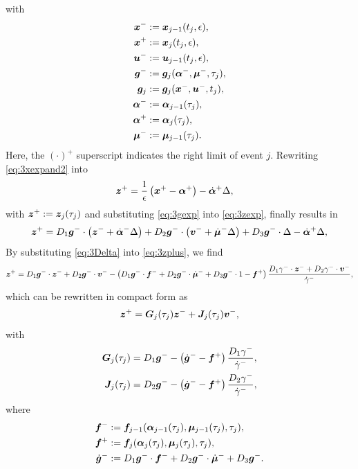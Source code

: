 \documentclass[../DC2017114Bouma.tex]{subfiles}
\begin{document}
with
\begin{align*}
\xb^- &:= \xb_{j-1}(t_{j},\epsilon),\\
\xb^+ &:= \xb_{j}(t_{j},\epsilon),\\
\ub^- &:= \ub_{j-1}(t_{j},\epsilon),\\
\gb^- &:= \gb_j(\alphab^-,\mub^-,\tau_j),\\
\gb_j &:= \gb_j(\xb^-,\ub^-,t_j),\\
\alphab^- &:= \alphab_{j-1}(\tau_j),\\
\alphab^+ &:= \alphab_j(\tau_j),\\
\mub^- &:= \mub_{j-1}(\tau_j).
\end{align*}
Here, the $(\cdot)^+$ superscript indicates the right limit of event $j$. Rewriting \eqref{eq:3xexpand2} into
\begin{align}
\zb^+ &= \frac{1}{\epsilon}\left(\xb^{+} - \alphab^+\right) -\dot{\alphab}^+\Delta,\label{eq:3zexp}
\end{align}
with $\zb^+ := \zb_j(\tau_j)$ and substituting \eqref{eq:3gexp} into \eqref{eq:3zexp}, finally results in
\begin{equation}
\zb^+ = D_1\gb^-\cdot\left(\zb^- + \dot{\alphab}^-\Delta\right) + D_2\gb^-\cdot\left(\vb^- + \dot{\mub}^-\Delta\right) + D_3\gb^-\cdot\Delta - \dot{\alphab}^+\Delta,\label{eq:3zplus}
\end{equation}
By substituting \eqref{eq:3Delta} into \eqref{eq:3zplus}, we find
\begin{align}
\zb^+ = D_1\gb^-\cdot\zb^- + D_2\gb^-\cdot\vb^- - \left(D_1\gb^-\cdot \fb^- + D_2\gb^-\cdot\dot{\mub}^- + D_3\gb^-\cdot 1 - \fb^+\right)\frac{D_1\gamma^-\cdot\zb^- + D_2\gamma^-\cdot\vb^-}{\dot{\gamma}^-},
\end{align}
which can be rewritten in compact form as
\begin{align}
\zb^+ = \Gb_j(\tau_j)\zb^- + \Jb_j(\tau_j)\vb^-,\label{eq:3zbplus}
\end{align}
with 
\begin{align}
\Gb_j(\tau_j) & = D_1\gb^- - \left(\dot{\gb}^- - \fb^+\right)\frac{D_1\gamma^-}{\dot{\gamma}^-},\\
\Jb_j(\tau_j) & = D_2\gb^- - \left(\dot{\gb}^- - \fb^+\right)\frac{D_2\gamma^-}{\dot{\gamma}^-},
\end{align}
where
\begin{align*}
\fb^- &:= \fb_{j-1}(\alphab_{j-1}(\tau_j),\mub_{j-1}(\tau_j),\tau_j),\\
\fb^+ &:= \fb_j(\alphab_j(\tau_j),\mub_j(\tau_j),\tau_j),\\
\dot{\gb}^- &:= D_1\gb^-\cdot \fb^- + D_2\gb^-\cdot \dot{\mub}^- + D_3\gb^-.
\end{align*}
\end{document}
